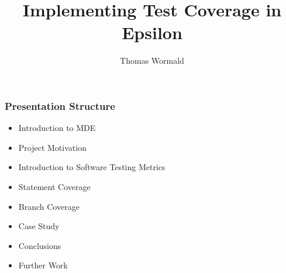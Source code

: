 \documentclass{beamer}
\author{Thomas Wormald}
\title{Implementing Test Coverage in Epsilon}
\begin{document}
\maketitle

\begin{frame}
\frametitle{Presentation Structure}
\begin{itemize}
\item Introduction to MDE
\item Project Motivation
\item Introduction to Software Testing Metrics
\item Statement Coverage
\item Branch Coverage
\item Case Study
\item Conclusions
\item Further Work
\end{itemize}
\end{frame}






\end{document}
